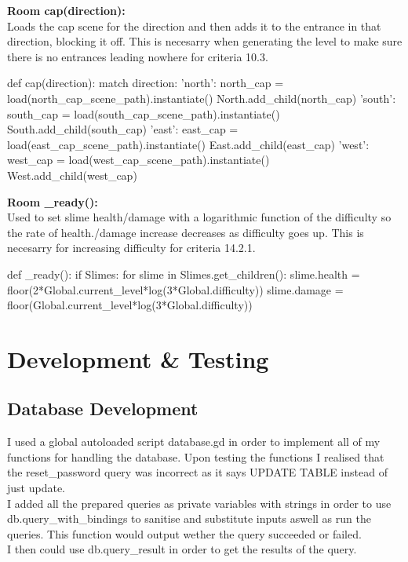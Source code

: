 \documentclass{article}
\begin{document}
        \textbf{Room cap(direction):}\\
        Loads the cap scene for the direction and then adds it to the entrance in that direction, blocking it off. This is necesarry when generating the level to make sure there is no entrances leading nowhere for criteria 10.3.\\
        \begin{python}
def cap(direction):
   match direction:
      'north':
	 north_cap = load(north_cap_scene_path).instantiate()
	 North.add_child(north_cap)
      'south':
	 south_cap = load(south_cap_scene_path).instantiate()
	 South.add_child(south_cap)
      'east':
	 east_cap = load(east_cap_scene_path).instantiate()
	 East.add_child(east_cap)
      'west':
	 west_cap = load(west_cap_scene_path).instantiate()
	 West.add_child(west_cap)
        \end{python}
        \textbf{Room \_ready():}\\
        Used to set slime health/damage with a logarithmic function of the difficulty so the rate of health./damage increase decreases as difficulty goes up. This is necesarry for increasing difficulty for criteria 14.2.1.\\
        \begin{python}
def _ready():
   if Slimes:
      for slime in Slimes.get_children():
	 slime.health = floor(2*Global.current_level*log(3*Global.difficulty))
	 slime.damage = floor(Global.current_level*log(3*Global.difficulty))
        \end{python}
        \section{Development \& Testing}
        \subsection{Database Development}
        I used a global autoloaded script database.gd in order to implement all of my functions for handling the database. Upon testing the functions I realised that the reset\_password query was incorrect as it says UPDATE TABLE instead of just update.\\
        I added all the prepared queries as private variables with strings in order to use db.query\_with\_bindings to sanitise and substitute inputs aswell as run the queries. This function would output wether the query succeeded or failed.\\
        I then could use db.query\_result in order to get the results of the query.\\
\end{document}
